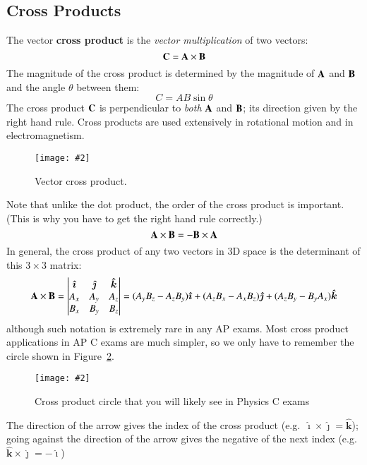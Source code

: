 \documentclass{../../../oss-handout}
\newcommand{\mb}[1]{\ensuremath\mathbf{#1}}
\newcommand{\pic}[2]{\texttt{[image: \#2]}}
\begin{document}
\subsection{Cross Products}
The vector \textbf{cross product} is the \emph{vector multiplication} of two
vectors:
\begin{equation*}
  \mb{C}=\mb{A}\times\mb{B}
\end{equation*}
The magnitude of the cross product is determined by the magnitude of $\mb{A}$
and $\mb{B}$ and the angle $\theta$ between them:
\begin{equation*}
  C=AB\sin\theta
\end{equation*}
The cross product $\mb{C}$ is perpendicular to \emph{both} $\mb{A}$ and
$\mb{B}$; its direction given by the right hand rule. Cross products are used
extensively in rotational motion and in electromagnetism.
\begin{figure}[ht]
  \centering
  \pic{.3}{cross-product.png}
  \caption{Vector cross product.}
  \label{fig:cross1}
\end{figure}
Note that unlike the dot product, the order of the cross product is important.
(This is why you have to get the right hand rule correctly.)
\begin{equation*}
  \mb{A}\times\mb{B}=-\mb{B}\times\mb{A}
\end{equation*}
In general, the cross product of any two vectors in 3D space is the determinant
of this $3\times 3$ matrix:
\begin{equation*}
  \mb{A}\times\mb{B}=
  \left|
  \begin{matrix}
    \bm{\hat{\imath}} & \bm{\hat{\jmath}} & \bm{\hat{k}}\\
    A_x & A_y & A_z\\
    B_x & B_y & B_z
  \end{matrix}
  \right|
  =(A_yB_z-A_zB_y)\bm{\hat{\imath}} +
  (A_zB_x-A_xB_z)\bm{\hat{\jmath}} +
  (A_zB_y-B_yA_x)\bm{\hat{k}}
\end{equation*}
although such notation is extremely rare in any AP exams. Most cross product
applications in AP C exams are much simpler, so we
only have to remember the circle shown in Figure~\ref{fig:cross2}.
\begin{figure}[ht]
  \centering
  \pic{.12}{cross-product-circle.png}
  \caption{Cross product circle that you will likely see in Physics C exams}
  \label{fig:cross2}
\end{figure}

The direction of the arrow gives the index of the cross product (e.g.\
$\bm{\hat{\imath}}\times\bm{\hat{\jmath}}=\bm{\hat{k}}$); going against the
direction of the arrow gives the negative of the next index (e.g.\
$\bm{\hat{k}}\times\bm{\hat{\jmath}}=-\bm{\hat{\imath}}$)
\end{document}
